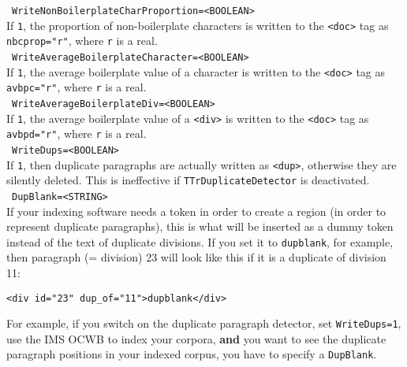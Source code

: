 \documentclass[12pt,a4paper]{article}
\begin{document}
\noindent\textbullet~\texttt{WriteNonBoilerplateCharProportion=<BOOLEAN>}\\

If \texttt{1}, the proportion of non-boilerplate characters is written to the \texttt{<doc>} tag as \texttt{nbcprop="r"}, where \texttt{r} is a real.\\

\noindent\textbullet~\texttt{WriteAverageBoilerplateCharacter=<BOOLEAN>}\\

If \texttt{1}, the average boilerplate value of a character is written to the \texttt{<doc>} tag as \texttt{avbpc="r"}, where \texttt{r} is a real.\\

\noindent\textbullet~\texttt{WriteAverageBoilerplateDiv=<BOOLEAN>}\\

If \texttt{1}, the average boilerplate value of a \texttt{<div>} is written to the \texttt{<doc>} tag as \texttt{avbpd="r"}, where \texttt{r} is a real.\\

\noindent\textbullet~\texttt{WriteDups=<BOOLEAN>}\\

If \texttt{1}, then duplicate paragraphs are actually written as \texttt{<dup>}, otherwise they are silently deleted.
This is ineffective if \texttt{TTrDuplicateDetector} is deactivated.\\

\noindent\textbullet~\texttt{DupBlank=<STRING>}\\

If your indexing software needs a token in order to create a region (in order to represent duplicate paragraphs), this is what will be inserted as a dummy token instead of the text of duplicate divisions.
If you set it to \texttt{dupblank}, for example, then paragraph (= division) 23 will look like this if it is a duplicate of division 11:

\begin{center}
  \texttt{<div id="23" dup\_of="11">dupblank</div>}
\end{center}

For example, if you switch on the duplicate paragraph detector, set \texttt{WriteDups=1}, use the IMS OCWB to index your corpora, \textbf{and} you want to see the duplicate paragraph positions in your indexed corpus, you have to specify a \texttt{DupBlank}.\\
\end{document}
